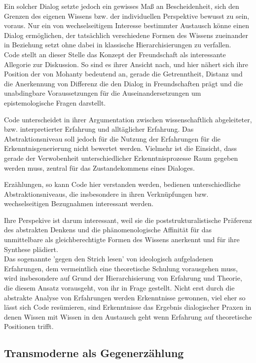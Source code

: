 Ein solcher Dialog setzte jedoch ein gewisses Maß an Bescheidenheit, sich den
Grenzen des eigenen Wissens bzw. der individuellen Perspektive bewusst zu sein,
voraus. Nur ein von wechselseitigem Interesse bestimmter Austausch könne einen
Dialog ermöglichen, der tatsächlich verschiedene Formen des Wissens zueinander
in Beziehung setzt ohne dabei in klassische Hierarchisierungen zu verfallen.\\
Code stellt an dieser Stelle das Konzept der Freundschaft als interessante
Allegorie zur Diskussion. So sind es ihrer Ansicht nach, und hier nähert sich
ihre Position der von Mohanty bedeutend an, gerade die Getrenntheit, Distanz und
die Anerkennung von Differenz die den Dialog in Freundschaften prägt und die
unabdingbare Voraussetzungen für die Auseinandersetzungen um epistemologische
Fragen darstellt.\footnotemark {}

Code unterscheidet in ihrer Argumentation zwischen wissenschaftlich
abgeleiteter, bzw. interpretierter Erfahrung und alltäglicher Erfahrung. Das
Abstraktionsniveau soll jedoch für die Nutzung der Erfahrungen für die
Erkenntnisgenerierung nicht bewertet werden. Vielmehr ist die Einsicht, dass
gerade der Verwobenheit unterschiedlicher Erkenntnisprozesse Raum gegeben werden
muss, zentral für das Zustandekommens eines Dialoges.\footnotemark
{}

Erzählungen, so kann Code hier verstanden werden, bedienen unterschiedliche
Abstraktionsniveaus, die insbesondere in ihren Verknüpfungen bzw.
wechselseitigen Bezugnahmen interessant werden.

Ihre Perspekive ist darum interessant, weil sie die poststrukturalistische
Präferenz des abstrakten Denkens und die phänomenologische Affinität für das
unmittelbare als gleichberechtigte Formen des Wissens anerkennt und für ihre
Synthese plädiert. \\
Das sogenannte 'gegen den Strich lesen' von ideologisch
aufgeladenen Erfahrungen, dem vermeintlich eine theoretische Schulung
vorausgehen muss, wird insbesondere auf Grund der Hierarchisierung von Erfahrung
und Theorie, die diesem Ansatz vorausgeht, von ihr in Frage gestellt. Nicht erst
durch die abstrakte Analyse von  Erfahrungen werden Erkenntnisse gewonnen, viel
eher so lässt sich Code resümieren, sind Erkenntnisse das Ergebnis dialogischer
Praxen in denen Wissen mit Wissen in den Austausch geht wenn Erfahrung auf
theoretische Positionen trifft.

\subsection{Transmoderne als Gegenerzählung}

